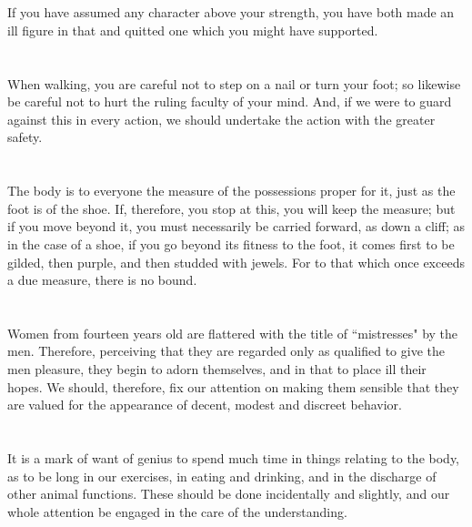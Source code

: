 \documentclass[12pt]{article}
\begin{document}
\section{}

If you have assumed any character above your strength, you have
both made an ill figure in that and quitted one which you might have
supported. 

\section{}

When walking, you are careful not to step on a nail or turn your
foot; so likewise be careful not to hurt the ruling faculty of your
mind. And, if we were to guard against this in every action, we should
undertake the action with the greater safety. 

\section{}

The body is to everyone the measure of the possessions proper
for it, just as the foot is of the shoe. If, therefore, you stop at
this, you will keep the measure; but if you move beyond it, you must
necessarily be carried forward, as down a cliff; as in the case of
a shoe, if you go beyond its fitness to the foot, it comes first to
be gilded, then purple, and then studded with jewels. For to that
which once exceeds a due measure, there is no bound. 

\section{}

Women from fourteen years old are flattered with the title of
``mistresses" by the men. Therefore, perceiving that they are regarded
only as qualified to give the men pleasure, they begin to adorn themselves,
and in that to place ill their hopes. We should, therefore, fix our
attention on making them sensible that they are valued for the appearance
of decent, modest and discreet behavior. 

\section{}

It is a mark of want of genius to spend much time in things relating
to the body, as to be long in our exercises, in eating and drinking,
and in the discharge of other animal functions. These should be done
incidentally and slightly, and our whole attention be engaged in the
care of the understanding. 
\end{document}
